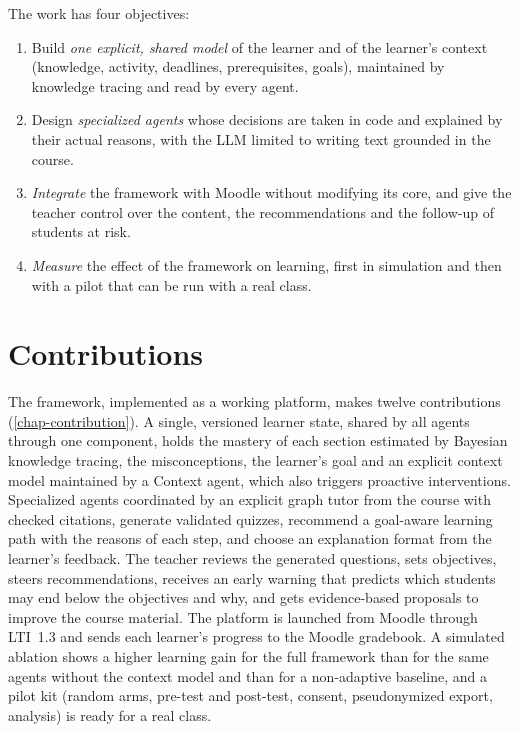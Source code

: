 The work has four objectives:
\begin{enumerate}
  \item Build \emph{one explicit, shared model} of the learner and of the
        learner's context (knowledge, activity, deadlines, prerequisites,
        goals), maintained by knowledge tracing and read by every agent.
  \item Design \emph{specialized agents} whose decisions are taken in
        code and explained by their actual reasons, with the LLM limited
        to writing text grounded in the course.
  \item \emph{Integrate} the framework with Moodle without modifying its
        core, and give the teacher control over the content, the
        recommendations and the follow-up of students at risk.
  \item \emph{Measure} the effect of the framework on learning, first in
        simulation and then with a pilot that can be run with a real
        class.
\end{enumerate}

\section*{Contributions}

The framework, implemented as a working platform, makes twelve
contributions (\cref{chap-contribution}). A single, versioned learner
state, shared by all agents through one component, holds the mastery of
each section estimated by Bayesian knowledge tracing, the misconceptions,
the learner's goal and an explicit context model maintained by a Context
agent, which also triggers proactive interventions. Specialized agents
coordinated by an explicit graph tutor from the course with checked
citations, generate validated quizzes, recommend a goal-aware learning
path with the reasons of each step, and choose an explanation format from
the learner's feedback. The teacher reviews the generated questions, sets
objectives, steers recommendations, receives an early warning that
predicts which students may end below the objectives and why, and gets
evidence-based proposals to improve the course material. The platform is
launched from Moodle through LTI~1.3 and sends each learner's progress to
the Moodle gradebook. A simulated ablation shows a higher learning gain
for the full framework than for the same agents without the context
model and than for a non-adaptive baseline, and a pilot kit (random arms,
pre-test and post-test, consent, pseudonymized export, analysis) is
ready for a real class.

